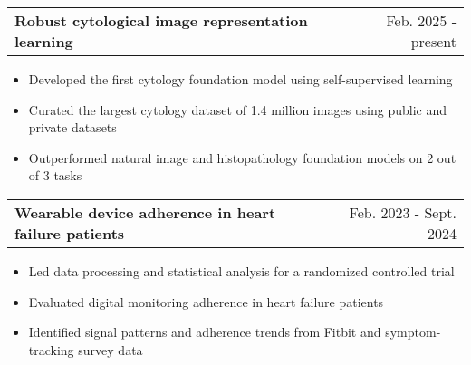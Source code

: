 \documentclass[a4paper,12pt]{article}
\makeatletter
\newenvironment{projectlong}[2]
    {
    \begin{tabularx}{\linewidth}{@{}l X r@{}}
    \textbf{#1} & \hfill &  #2 \\
    \end{tabularx}
    \begin{minipage}[t]{\linewidth}
    \begin{itemize}[nosep,after=\strut, leftmargin=1em, itemsep=3pt,label=\scriptsize$\bullet$]
    }
    {
    \end{itemize}
    \end{minipage}    
    }
\makeatother
\begin{document}
\begin{projectlong}{Robust cytological image representation learning}{Feb. 2025 - present}
    \item Developed the first cytology foundation model using self-supervised learning 
    \item Curated the largest cytology dataset of 1.4 million images using public and private datasets
    \item Outperformed natural image and histopathology foundation models on 2 out of 3 tasks
\end{projectlong}

\begin{projectlong}{Wearable device adherence in heart failure patients}{Feb. 2023 - Sept. 2024}
    \item Led data processing and statistical analysis for a randomized controlled trial 
    \item Evaluated digital monitoring adherence in heart failure patients
    \item Identified signal patterns and adherence trends from Fitbit and symptom-tracking survey data
\end{projectlong}





\end{document}
